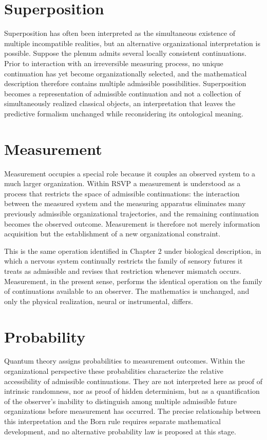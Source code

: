 \documentclass[11pt,oneside]{book}
\numberwithin{equation}{chapter}
\theoremstyle{definition}
\theoremstyle{plain}
\begin{document}
\section{Superposition}

Superposition has often been interpreted as the simultaneous existence of multiple incompatible realities, but an alternative organizational interpretation is possible. Suppose the plenum admits several locally consistent continuations. Prior to interaction with an irreversible measuring process, no unique continuation has yet become organizationally selected, and the mathematical description therefore contains multiple admissible possibilities. Superposition becomes a representation of admissible continuation and not a collection of simultaneously realized classical objects, an interpretation that leaves the predictive formalism unchanged while reconsidering its ontological meaning.

\section{Measurement}

Measurement occupies a special role because it couples an observed system to a much larger organization. Within RSVP a measurement is understood as a process that restricts the space of admissible continuations: the interaction between the measured system and the measuring apparatus eliminates many previously admissible organizational trajectories, and the remaining continuation becomes the observed outcome. Measurement is therefore not merely information acquisition but the establishment of a new organizational constraint.

This is the same operation identified in Chapter 2 under biological description, in which a nervous system continually restricts the family of sensory futures it treats as admissible and revises that restriction whenever mismatch occurs. Measurement, in the present sense, performs the identical operation on the family of continuations available to an observer. The mathematics is unchanged, and only the physical realization, neural or instrumental, differs.

\section{Probability}

Quantum theory assigns probabilities to measurement outcomes. Within the organizational perspective these probabilities characterize the relative accessibility of admissible continuations. They are not interpreted here as proof of intrinsic randomness, nor as proof of hidden determinism, but as a quantification of the observer's inability to distinguish among multiple admissible future organizations before measurement has occurred. The precise relationship between this interpretation and the Born rule requires separate mathematical development, and no alternative probability law is proposed at this stage.
\end{document}
